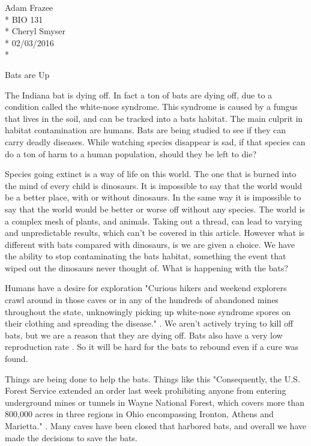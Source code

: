 \documentclass[12pt]{article}
\begin{document}
	\begin{flushleft}
		Adam Frazee \\*
		BIO 131\\*
		Cheryl Smyser\\*
		02/03/2016\\*
	\end{flushleft}

\begin{center}
 \Large{Bats are Up}
\end{center}
\doublespacing

The Indiana bat is dying off. In fact a ton of bats are dying off, due to a condition called the white-nose syndrome. This syndrome is caused by a fungus that lives in the soil, and can be tracked into a bats habitat. The main culprit in habitat contamination are humans. Bats are being studied to see if they can carry deadly diseases. While watching species disappear is sad, if that species can do a ton of harm to a human population, should they be left to die? 

Species going extinct is a way of life on this world. The one that is burned into the mind of every child is dinosaurs. It is impossible to say that the world would be a better place, with or without dinosaurs. In the same way it is impossible to say that the world would be better or worse off without any species. The world is a complex mesh of plants, and animals. Taking out a thread, can lead to varying and unpredictable results, which can't be covered in this article. However what is different with bats compared with dinosaurs, is we are given a choice. We have the ability to stop contaminating the bats habitat, something the event that wiped out the dinosaurs never thought of. What is happening with the bats?

Humans have a desire for exploration "Curious hikers and weekend explorers crawl around in those caves or in any of the hundreds of abandoned mines throughout the state, unknowingly picking up white-nose syndrome spores on their clothing and spreading the disease." \cite{dispatch}. We aren't actively trying to kill off bats, but we are a reason that they are dying off. Bats also have a very low reproduction rate \cite{dispatch}. So it will be hard for the bats to rebound even if a cure was found.

Things are being done to help the bats. Things like this "Consequently, the U.S. Forest Service extended an order last week prohibiting anyone from entering underground mines or tunnels in Wayne National Forest, which covers more than 800,000 acres in three regions in Ohio encompassing Ironton, Athens and Marietta." \cite{dispatch}. Many caves have been closed that harbored bats, and overall we have made the decisions to save the bats.
\end{document}
